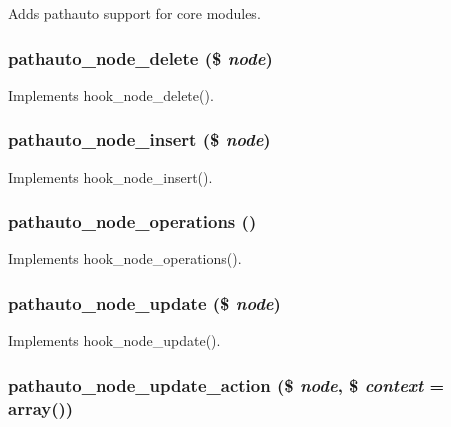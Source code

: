 Adds pathauto support for core modules. \hypertarget{pathauto_8module_ab1416f7c389afd71659c4a6faed9b92c}{
\subsubsection[{pathauto\_\-node\_\-delete}]{\setlength{\rightskip}{0pt plus 5cm}pathauto\_\-node\_\-delete (\$ {\em node})}}
\label{pathauto_8module_ab1416f7c389afd71659c4a6faed9b92c}
Implements hook\_\-node\_\-delete(). \hypertarget{pathauto_8module_add29f7fab0e1fed4b1f6f7611822c94f}{
\subsubsection[{pathauto\_\-node\_\-insert}]{\setlength{\rightskip}{0pt plus 5cm}pathauto\_\-node\_\-insert (\$ {\em node})}}
\label{pathauto_8module_add29f7fab0e1fed4b1f6f7611822c94f}
Implements hook\_\-node\_\-insert(). \hypertarget{pathauto_8module_a141f6c04361a1572bb0c02681de7f22f}{
\subsubsection[{pathauto\_\-node\_\-operations}]{\setlength{\rightskip}{0pt plus 5cm}pathauto\_\-node\_\-operations ()}}
\label{pathauto_8module_a141f6c04361a1572bb0c02681de7f22f}
Implements hook\_\-node\_\-operations(). \hypertarget{pathauto_8module_ae9e518cbd22ab87a5ab49500f095123b}{
\subsubsection[{pathauto\_\-node\_\-update}]{\setlength{\rightskip}{0pt plus 5cm}pathauto\_\-node\_\-update (\$ {\em node})}}
\label{pathauto_8module_ae9e518cbd22ab87a5ab49500f095123b}
Implements hook\_\-node\_\-update(). \hypertarget{pathauto_8module_abe86e5924ea06f972dd7c6de8b57c7f1}{
\subsubsection[{pathauto\_\-node\_\-update\_\-action}]{\setlength{\rightskip}{0pt plus 5cm}pathauto\_\-node\_\-update\_\-action (\$ {\em node}, \/  \$ {\em context} = {\ttfamily array()})}}
